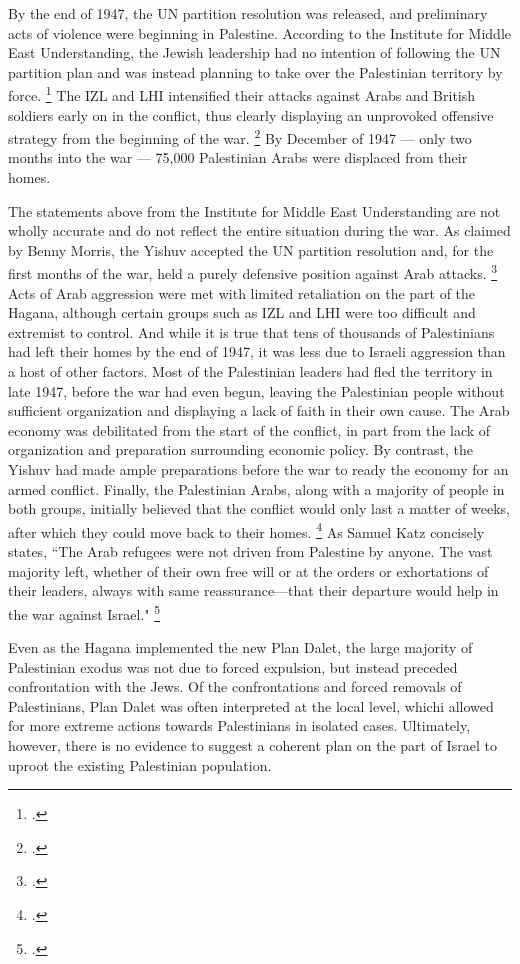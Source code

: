 \documentclass[12pt]{turabian-researchpaper}
\begin{document}
By the end of 1947, the UN partition resolution was released, and preliminary acts of violence were beginning in Palestine.  According to the Institute for Middle East Understanding, the Jewish leadership had no intention of following the UN partition plan and was instead planning to take over the Palestinian territory by force.
\footcite{nabka}
The IZL and LHI intensified their attacks against Arabs and British soldiers early on in the conflict, thus clearly displaying an unprovoked offensive strategy from the beginning of the war.
\footcite{nabka}
By December of 1947 --- only two months into the war --- 75,000 Palestinian Arabs were displaced from their homes.



The statements above from the Institute for Middle East Understanding are not wholly accurate and do not reflect the entire situation during the war.  As claimed by Benny Morris, the Yishuv accepted the UN partition resolution and, for the first months of the war, held a purely defensive position against Arab attacks.
\footcite[][98-100]{morris}
Acts of Arab aggression were met with limited retaliation on the part of the Hagana, although certain groups such as IZL and LHI were too difficult and extremist to control.
And while it is true that tens of thousands of Palestinians had left their homes by the end of 1947, it was less due to Israeli aggression than a host of other factors.  Most of the Palestinian leaders had fled the territory in late 1947, before the war had even begun, leaving the Palestinian people without sufficient organization and displaying a lack of faith in their own cause.  The Arab economy was debilitated from the start of the conflict, in part from the lack of organization and preparation surrounding economic policy.  By contrast, the Yishuv had made ample preparations before the war to ready the economy for an armed conflict.  Finally, the Palestinian Arabs, along with a majority of people in both groups, initially believed that the conflict would only last a matter of weeks, after which they could move back to their homes.
\footcite[][84-85]{pappe}
As Samuel Katz concisely states, ``The Arab refugees were not driven from Palestine by anyone.  The vast majority left, whether of their own free will or at the orders or exhortations of their leaders, always with same reassurance—that their departure would help in the war against Israel."
\footcite[][64]{dajani}



Even as the Hagana implemented the new Plan Dalet, the large majority of Palestinian exodus was not due to forced expulsion, but instead preceded confrontation with the Jews.  Of the confrontations and forced removals of Palestinians, Plan Dalet was often interpreted at the local level, whichi allowed for more extreme actions towards Palestinians in isolated cases.  Ultimately, however, there is no evidence to suggest a coherent plan on the part of Israel to uproot the existing Palestinian population.
\end{document}
